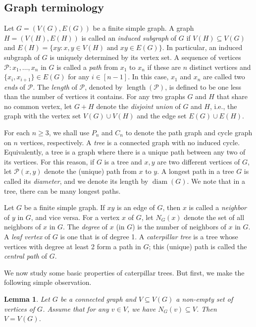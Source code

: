 \documentclass{amsart}
\newtheorem{lemma}[theorem]{Lemma}
\theoremstyle{remark}
\theoremstyle{definition}
\DeclareMathOperator{\diam}{diam}
\DeclareMathOperator{\length}{length}
\begin{document}
	\subsection{Graph terminology}
	
	Let $G=(V(G),E(G))$ be a finite simple graph. A graph $H=(V(H),E(H))$ is called an \emph{induced subgraph} of $G$ if $V(H)\subseteq V(G)$ and $E(H)=\{xy \colon x,y\in V(H) \text{ and }xy\in E(G) \}$. In particular, an induced subgraph of $G$ is uniquely determined by its vertex set. A sequence of vertices $\mathcal{P}\colon x_1,\dots, x_n$ in $G$ is called a \emph{path} from $x_1$ to $x_n$ if these are $n$ distinct vertices and $\{x_i,x_{i+1}\}\in E(G)$ for any $i\in [n-1]$. In this case, $x_1$ and $x_n$ are called two \emph{ends} of $\mathcal{P}$. The \emph{length} of $\mathcal{P}$, denoted by $\length(\mathcal{P})$, is defined to be one less than the number of vertices it contains. For any two graphs $G$ and $H$ that share no common vertex, let $G+H$ denote the \emph{disjoint union} of $G$ and $H$, i.e., the graph with the vertex set $V(G)\cup V(H)$ and the edge set $E(G)\cup E(H)$.
	
	For each $n\geq 3$, we shall use $P_n$ and $C_n$ to denote the path graph and cycle graph on $n$ vertices, respectively. A \emph{tree} is a connected graph with no induced cycle.  Equivalently, a tree is a graph where there is a unique path between any two of its vertices. For this reason, if $G$ is a tree and $x,y$ are two different vertices of $G$, let $\mathcal{P}(x,y)$ denote the (unique) path from $x$ to $y$.
	A longest path in a tree $G$ is called its \emph{diameter}, and we denote its length by $\diam(G)$. We note that in a tree, there can be many longest paths. 
	
	Let $G$ be a finite simple graph. If $xy$ is an edge of $G$, then $x$ is called a \emph{neighbor} of $y$ in $G$, and vice versa. For a vertex $x$ of $G$, let $N_G(x)$ denote the set of all neighbors of $x$ in $G$. The \emph{degree} of $x$ (in $G$) is the number of neighbors of $x$ in $G$. A \emph{leaf vertex} of $G$ is one that is of degree 1.  A \emph{caterpillar tree} is a tree whose vertices with degree at least 2 form a path in $G$; this (unique) path is called the \emph{central path} of $G$. 
    
    \iffalse
    \color{red} We now study some basic properties of caterpillar trees. But first, we make the following simple observation.
    
	\begin{lemma}\label{lem:closed-under-neighbors-vertex-set}
		Let $G$ be a connected graph and $V\subseteq V(G)$ a non-empty set of vertices of $G$. Assume that for any $v\in V$, we have $N_G(v)\subseteq V$. Then $V=V(G)$.
	\end{lemma}
	
\end{document}
